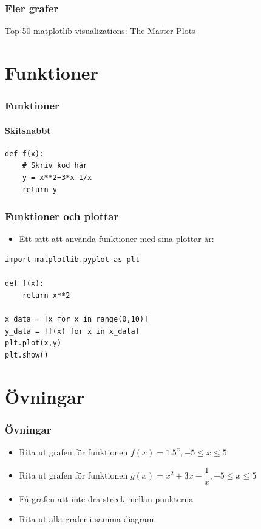 \documentclass[aspectratio=169]{beamer}
\begin{document}
\begin{frame}
\frametitle{Fler grafer}

\href{https://www.machinelearningplus.com/plots/top-50-matplotlib-visualizations-the-master-plots-python/}{Top 50 matplotlib visualizations: The Master Plots}

\end{frame}

\section{Funktioner}

\begin{frame}[fragile]
\frametitle{Funktioner}
\framesubtitle{Skitsnabbt}

\begin{lstlisting}
def f(x):
    # Skriv kod här
    y = x**2+3*x-1/x
    return y
\end{lstlisting}

\end{frame}

\begin{frame}[fragile]
	\frametitle{Funktioner och plottar}

	\begin{itemize}
		\item Ett sätt att använda funktioner med sina plottar är:
	\end{itemize}
	
	\begin{lstlisting}
import matplotlib.pyplot as plt

def f(x):
    return x**2
    
x_data = [x for x in range(0,10)]
y_data = [f(x) for x in x_data] 
plt.plot(x,y)
plt.show()
	\end{lstlisting}

\end{frame}

\section{Övningar}

\begin{frame}
\frametitle{Övningar}

	\begin{itemize}
		\item Rita ut grafen för funktionen \(f(x)=1.5^x, -5\leq x\leq5\)
		\item Rita ut grafen för funktionen \(g(x)=x^2+3x-\dfrac{1}{x}, -5\leq x\leq5\)
		\item Få grafen att inte dra streck mellan punkterna
		\item Rita ut alla grafer i samma diagram.
	\end{itemize}

\end{frame}
\end{document}
